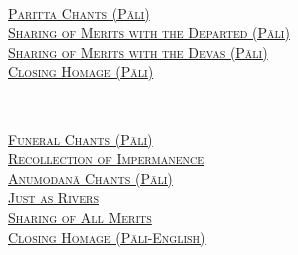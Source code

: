 {  \clearpage
  \vspace{1.5cm}

  {\libertinusFont\selectfont\textbf{\textsc{\fontsize{18}{12}\selectfont{}}}}\\

  \textsc{\fontsize{14.4}{28}\selectfont
    \hyperref[deva-aradhana]{Paritta Chants (Pāli)} \ifdesktopversion\else\pageref{deva-aradhana}\fi\\
    \hyperref[sharing-merits-departed]{Sharing of Merits with the Departed (Pāli)} \ifdesktopversion\else\pageref{sharing-merits-departed}\fi\\
    \hyperref[sharing-merits-devas]{Sharing of Merits with the Devas (Pāli)} \ifdesktopversion\else\pageref{sharing-merits-devas}\fi\\
    \hyperref[closing-homage]{Closing Homage (Pāli)} \ifdesktopversion\else\pageref{closing-homage}\fi\\
  }

  \vspace{1.5cm}

  {\libertinusFont\selectfont\textbf{\textsc{\fontsize{18}{12}\selectfont{}}}}\\

  \textsc{\fontsize{14.4}{28}\selectfont
    \hyperref[pubba-bhaga-nama-kara-patho]{Funeral Chants (Pāli)} \ifdesktopversion\else\pageref{pubba-bhaga-nama-kara-patho}\fi\\
    \hyperref[recollection-impermanence]{Recollection of Impermanence} \ifdesktopversion\else\pageref{recollection-impermanence}\fi\\
    \hyperref[yatha-vari-vaha-pura]{Anumodanā Chants (Pāli)} \ifdesktopversion\else\pageref{yatha-vari-vaha-pura}\fi\\
    \hyperref[just-as-rivers]{Just as Rivers} \ifdesktopversion\else\pageref{just-as-rivers}\fi\\
    \hyperref[sharing-all-merits]{Sharing of All Merits} \ifdesktopversion\else\pageref{sharing-all-merits}\fi\\
    \hyperref[closing-homage]{Closing Homage (Pāli-English)} \ifdesktopversion\else\pageref{closing-homage}\fi\\
  }}
